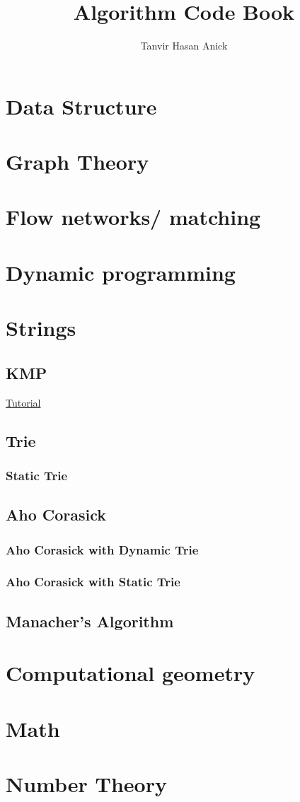 \documentclass[1pt]{report}
\title{Algorithm Code Book}
\author{Tanvir Hasan Anick}
\begin{document}
\maketitle
\tableofcontents
\newpage
\chapter{Data Structure}
\chapter{Graph Theory}
\chapter{Flow networks/ matching}
\chapter{Dynamic programming}
\chapter{Strings}
\section{KMP}
\href{https://tanvir002700.wordpress.com/2015/03/03/kmp-knuth-morris-pratt-algorithm/}{Tutorial}

\section{Trie}
\subsection{Static Trie}

\section{Aho Corasick}
\subsection{Aho Corasick with Dynamic Trie}

\subsection{Aho Corasick with Static Trie}

\section{Manacher's Algorithm}

\chapter{Computational geometry}
\chapter{Math}
\chapter{Number Theory}
\end{document}
